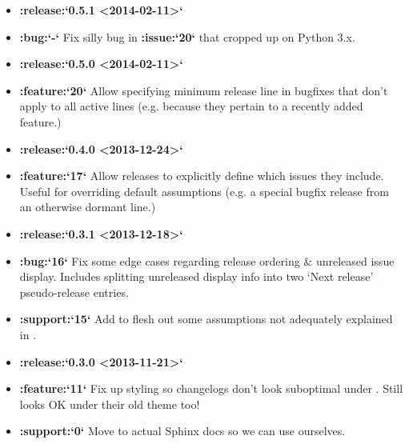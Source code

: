 \documentclass[letterpaper,10pt,english]{sphinxmanual}
\begin{document}
\begin{itemize}
\item {} 
{\color{red}\bfseries{}:release:{}`0.5.1 \textless{}2014-02-11\textgreater{}{}`}

\item {} 
{\color{red}\bfseries{}:bug:{}`-{}`} Fix silly bug in {\color{red}\bfseries{}:issue:{}`20{}`} that cropped up on Python 3.x.

\item {} 
{\color{red}\bfseries{}:release:{}`0.5.0 \textless{}2014-02-11\textgreater{}{}`}

\item {} 
{\color{red}\bfseries{}:feature:{}`20{}`} Allow specifying minimum release line in bugfixes that don’t
apply to all active lines (e.g. because they pertain to a recently added
feature.)

\item {} 
{\color{red}\bfseries{}:release:{}`0.4.0 \textless{}2013-12-24\textgreater{}{}`}

\item {} 
{\color{red}\bfseries{}:feature:{}`17{}`} Allow releases to explicitly define which issues they include.
Useful for overriding default assumptions (e.g. a special bugfix release from
an otherwise dormant line.)

\item {} 
{\color{red}\bfseries{}:release:{}`0.3.1 \textless{}2013-12-18\textgreater{}{}`}

\item {} 
{\color{red}\bfseries{}:bug:{}`16{}`} Fix some edge cases regarding release ordering \& unreleased issue
display. Includes splitting unreleased display info into two ‘Next release’
pseudo-release entries.

\item {} 
{\color{red}\bfseries{}:support:{}`15{}`} Add  to flesh out some assumptions not
adequately explained in .

\item {} 
{\color{red}\bfseries{}:release:{}`0.3.0 \textless{}2013-11-21\textgreater{}{}`}

\item {} 
{\color{red}\bfseries{}:feature:{}`11{}`} Fix up styling so changelogs don’t look suboptimal under . Still
looks OK under their old theme too!

\item {} 
{\color{red}\bfseries{}:support:{}`0{}`} Move to actual Sphinx docs so we can use ourselves.


\end{itemize}
\end{document}
